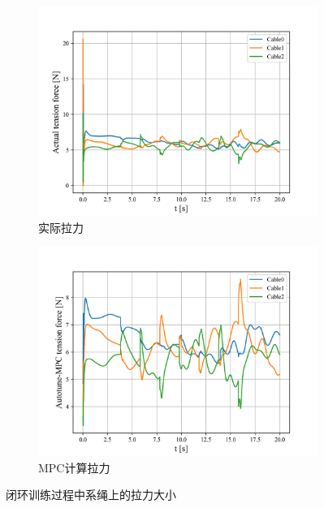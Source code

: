 \documentclass[lang=chs, degree=master, blindreview=false, winfonts=true]{yanputhesis}
\begin{document}
\begin{figure}[hbt!]
    \centering
    \begin{subfigure}[b]{0.48\textwidth}
        \centering
        \includegraphics[width=\textwidth]{picture/kk/cable_actual_tensions_fig_8_6quad_ol.png}
        \caption{实际拉力}
    \end{subfigure}
    \hfill
    \begin{subfigure}[b]{0.48\textwidth}
        \centering
        \includegraphics[width=\textwidth]{picture/kk/cable_MPC_tensions_fig_8_6quad_ol.png}
        \caption{MPC计算拉力}
    \end{subfigure}
	\caption{闭环训练过程中系绳上的拉力大小} 	
	\label{cjb1}
\end{figure}
\end{document}
